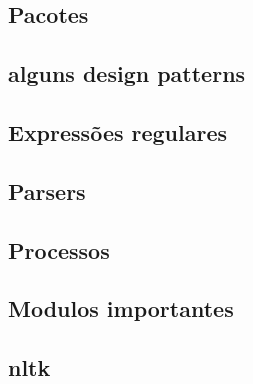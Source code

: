 \documentclass[portuges,a4paper]{article}
\begin{document}
\subsection{Pacotes}

\subsection{alguns design patterns}

\subsection{Expressões regulares}

\subsection{Parsers}

\subsection{Processos}

\subsection{Modulos importantes}

\subsection{ nltk}
\end{document}
